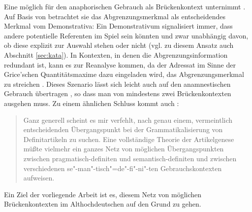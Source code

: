 Eine möglich  für den anaphorischen Gebrauch als Brückenkontext unternimmt  
\textcite{Schlachter2015}. Auf Basis von \textcite{Bisle-Muller1991} betrachtet sie das Abgrenzungsmerkmal als entscheidendes Merkmal vom Demonstrativa: Ein Demonstrativum signalisiert immer, dass andere potentielle Referenten im Spiel sein könnten und zwar unabhängig davon, ob diese explizit zur Auswahl stehen oder nicht (vgl. zu diesem Ansatz auch  Abschnitt \ref{sec:kata}). In Kontexten, in denen die Abgrenzungsinformation redundant ist, kann es zur Reanalyse kommen, da der Adressat im Sinne der Grice'schen Quantitätsmaxime \parencite[Mache deinen Beitrag nicht informativer als notwendig,][]{Grice1975} dazu eingeladen wird, das Abgrenzungsmerkmal zu streichen \parencite{Schlachter2015}. Dieses Szenario lässt sich leicht auch auf den anamnestischen Gebrauch übertragen \parencite[s. hierzu][]{Schlachter2015}, so dass man von mindestens zwei Brückenkontexten ausgehen muss. Zu einem ähnlichen Schluss kommt auch \textcite{Himmelmann1997}: 

\blockcquote[96]{Himmelmann1997}{
Ganz generell scheint es mir verfehlt, nach genau einem, vermeintlich entscheidenden
Übergangspunkt bei der Grammatikalisierung von Definitartikeln zu suchen. Eine vollständige
Theorie der Artikelgenese müßte vielmehr ein ganzes Netz von möglichen Übergangspunkten
zwischen pragmatisch-definiten und semantisch-definiten und zwischen verschiedenen
se"-man"-tisch"=de"-fi"-ni"-ten Gebrauchskontexten aufweisen.} 

\noindent
Ein Ziel der vorliegende Arbeit ist es, diesem Netz von möglichen Brückenkontexten im Althochdeutschen auf den Grund zu gehen. 

